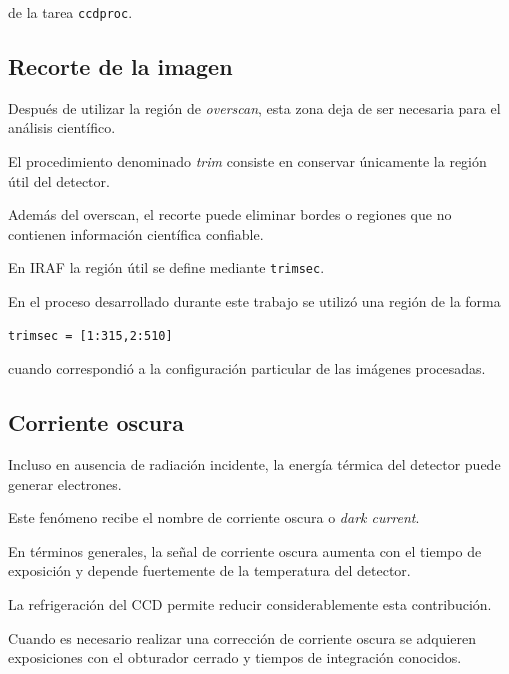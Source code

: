 \documentclass[12pt,letterpaper,oneside]{book}
\begin{document}
de la tarea \texttt{ccdproc}.



\subsection{Recorte de la imagen}

Después de utilizar la región de \textit{overscan}, esta zona deja de ser necesaria para el análisis científico.

El procedimiento denominado \textit{trim} consiste en conservar únicamente la región útil del detector.

Además del overscan, el recorte puede eliminar bordes o regiones que no contienen información científica confiable.

En IRAF la región útil se define mediante \texttt{trimsec}.

En el proceso desarrollado durante este trabajo se utilizó una región de la forma

\begin{verbatim}
trimsec = [1:315,2:510]
\end{verbatim}

cuando correspondió a la configuración particular de las imágenes procesadas.



\subsection{Corriente oscura}

Incluso en ausencia de radiación incidente, la energía térmica del detector puede generar electrones.

Este fenómeno recibe el nombre de corriente oscura o \textit{dark current}.

En términos generales, la señal de corriente oscura aumenta con el tiempo de exposición y depende fuertemente de la temperatura del detector.

La refrigeración del CCD permite reducir considerablemente esta contribución.

Cuando es necesario realizar una corrección de corriente oscura se adquieren exposiciones con el obturador cerrado y tiempos de integración conocidos.
\end{document}
